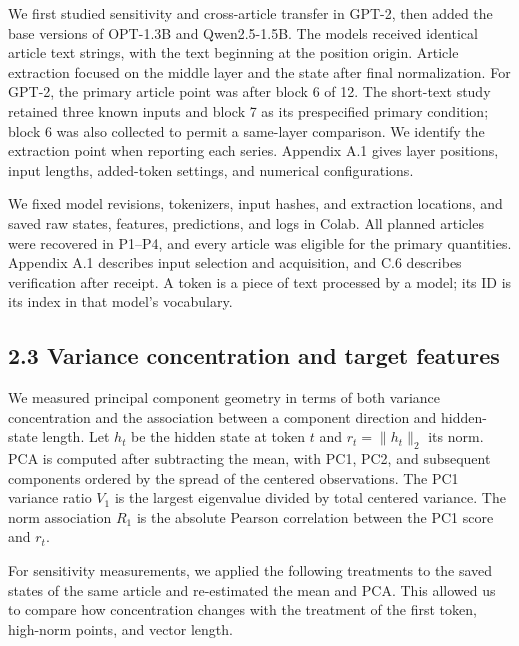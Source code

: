 We first studied sensitivity and cross-article transfer in GPT-2, then added the base versions of OPT-1.3B and Qwen2.5-1.5B. The models received identical article text strings, with the text beginning at the position origin. Article extraction focused on the middle layer and the state after final normalization. For GPT-2, the primary article point was after block 6 of 12. The short-text study retained three known inputs and block 7 as its prespecified primary condition; block 6 was also collected to permit a same-layer comparison. We identify the extraction point when reporting each series. Appendix A.1 gives layer positions, input lengths, added-token settings, and numerical configurations.

We fixed model revisions, tokenizers, input hashes, and extraction locations, and saved raw states, features, predictions, and logs in Colab. All planned articles were recovered in P1--P4, and every article was eligible for the primary quantities. Appendix A.1 describes input selection and acquisition, and C.6 describes verification after receipt. A token is a piece of text processed by a model; its ID is its index in that model's vocabulary.

\FloatBarrier

\subsection{2.3 Variance concentration and target features}\label{variance-concentration-and-target-features}

We measured principal component geometry in terms of both variance concentration and the association between a component direction and hidden-state length. Let \(h_t\) be the hidden state at token \(t\) and \(r_t=\|h_t\|_2\) its norm. PCA is computed after subtracting the mean, with PC1, PC2, and subsequent components ordered by the spread of the centered observations. The PC1 variance ratio \(V_1\) is the largest eigenvalue divided by total centered variance. The norm association \(R_1\) is the absolute Pearson correlation between the PC1 score and \(r_t\).

For sensitivity measurements, we applied the following treatments to the saved states of the same article and re-estimated the mean and PCA. This allowed us to compare how concentration changes with the treatment of the first token, high-norm points, and vector length.

